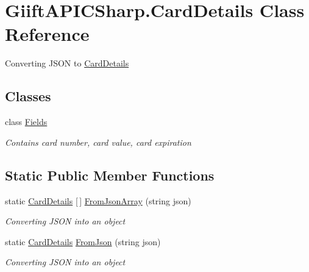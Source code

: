 \hypertarget{class_giift_a_p_i_c_sharp_1_1_card_details}{}\section{Giift\+A\+P\+I\+C\+Sharp.\+Card\+Details Class Reference}
\label{class_giift_a_p_i_c_sharp_1_1_card_details}


Converting J\+S\+ON to \hyperlink{class_giift_a_p_i_c_sharp_1_1_card_details}{Card\+Details}  


\subsection*{Classes}
\begin{DoxyCompactItemize}
\item 
class \hyperlink{class_giift_a_p_i_c_sharp_1_1_card_details_1_1_fields}{Fields}
\begin{DoxyCompactList}\small\item\em Contains card number, card value, card expiration \end{DoxyCompactList}\end{DoxyCompactItemize}
\subsection*{Static Public Member Functions}
\begin{DoxyCompactItemize}
\item 
static \hyperlink{class_giift_a_p_i_c_sharp_1_1_card_details}{Card\+Details} \mbox{[}$\,$\mbox{]} \hyperlink{class_giift_a_p_i_c_sharp_1_1_card_details_aafd3970ef08a42122c7bec0c776c2e8d}{From\+Json\+Array} (string json)
\begin{DoxyCompactList}\small\item\em Converting J\+S\+ON into an object \end{DoxyCompactList}\item 
static \hyperlink{class_giift_a_p_i_c_sharp_1_1_card_details}{Card\+Details} \hyperlink{class_giift_a_p_i_c_sharp_1_1_card_details_a5660bd7c1e94ef1c631189c31232f640}{From\+Json} (string json)
\begin{DoxyCompactList}\small\item\em Converting J\+S\+ON into an object \end{DoxyCompactList}\end{DoxyCompactItemize}

